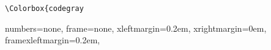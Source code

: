 \blindmathtrue


\NewCommandCopy\oldtodo\todo
\outer\def\todo[#1]{\icprotect{\oldtodo[#1]}}


\makeatletter
\xpretocmd\lstinline{\Colorbox{codegray}\bgroup\appto\lst@DeInit{\egroup}}{}{}
\makeatother

{numbers=none,
frame=none, 
xleftmargin=0.2em, 
xrightmargin=0em, 
framexleftmargin=0.2em,
}


\newcommand{\mylistlabelfont}[1]{\normalfont\textit{#1:}}


\newcommand{\inlinec}{\lstinline[language=C,basicstyle=\ttfamily]}
\newcommand{\inlineplain}{\lstinline[language={},basicstyle=\ttfamily]}

%\newcommand*{\lstitem}[1]{

%

\DeclareMathOperator{\trace}{trace}
\DeclareMathOperator{\diag}{diag}